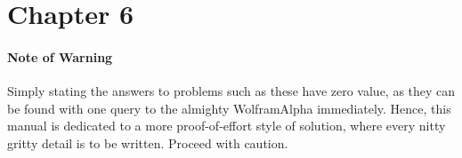 \section{Chapter 6}

\paragraph{Note of Warning}
Simply stating the answers to problems such as these have zero value,
as they can be found with one query to the almighty WolframAlpha immediately.
Hence, this manual is dedicated to a more proof-of-effort style of solution,
where every nitty gritty detail is to be written.
Proceed with caution.

\begin{enumerate}[wide, labelindent=0pt, label=\arabic*.]
    
    
    
    
    
    
    
    
    
    
    
\end{enumerate}
